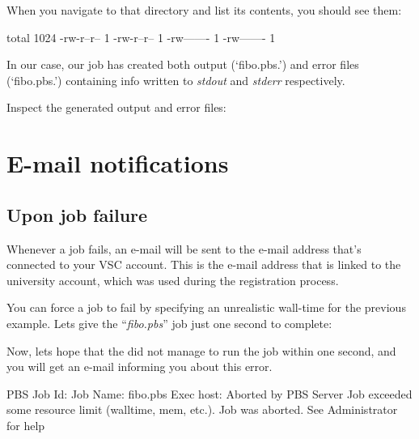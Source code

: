 When you navigate to that directory and list its contents, you should see them:

\begin{prompt}
total 1024
-rw-r--r-- 1 %
-rw-r--r-- 1 %
-rw------- 1 %
-rw------- 1 %
\end{prompt}

In our case, our job has created both output (`fibo.pbs.\jobnumber') and
error files (`fibo.pbs.\jobnumber') containing info written to
\emph{stdout} and \emph{stderr} respectively.

Inspect the generated output and error files:

\begin{prompt}
\end{prompt}

\section{E-mail notifications}

\ifgent
\else
  \subsection{Upon job failure}

  Whenever a job fails, an e-mail will be sent to the e-mail address that's
  connected to your VSC account. This is the e-mail address that is linked
  to the university account, which was used during the registration process.

  You can force a job to fail by specifying an unrealistic wall-time for the
  previous example.  Lets give the ``\emph{fibo.pbs}'' job just one second to
  complete:

\begin{prompt}
\end{prompt}

  Now, lets hope that the \hpc did not manage to run the job within one second,
  and you will get an e-mail informing you about this error.

  \begin{flattext}
  PBS Job Id: %
  Job Name:   fibo.pbs
  Exec host:  %
  Aborted by PBS Server
  Job exceeded some resource limit (walltime, mem, etc.). Job was aborted.
  See Administrator for help
  \end{flattext}
\fi


